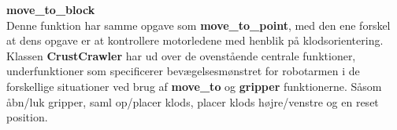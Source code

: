 \textbf{move\_to\_block}\\
Denne funktion har samme opgave som \textbf{move\_to\_point}, med den ene forskel at dens opgave er at kontrollere motorledene med henblik på klodsorientering.\\

Klassen \textbf{CrustCrawler} har ud over de ovenstående centrale funktioner, underfunktioner som specificerer bevægelsesmønstret for robotarmen i de forskellige situationer ved brug af \textbf{move\_to} og \textbf{gripper} funktionerne. Såsom åbn/luk gripper, saml op/placer klods, placer klods højre/venstre og en reset position.